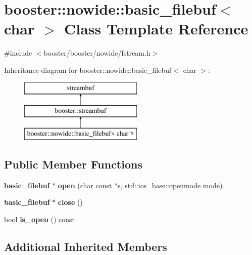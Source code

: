 \section{booster\-:\-:nowide\-:\-:basic\-\_\-filebuf$<$ char $>$ Class Template Reference}
\label{classbooster_1_1nowide_1_1basic__filebuf_3_01char_01_4}


{\ttfamily \#include $<$booster/booster/nowide/fstream.\-h$>$}

Inheritance diagram for booster\-:\-:nowide\-:\-:basic\-\_\-filebuf$<$ char $>$\-:\begin{figure}[H]
\begin{center}
\leavevmode
\includegraphics[height=3.000000cm]{classbooster_1_1nowide_1_1basic__filebuf_3_01char_01_4}
\end{center}
\end{figure}
\subsection*{Public Member Functions}
\begin{DoxyCompactItemize}
\item 
{\bf basic\-\_\-filebuf} $\ast$ {\bfseries open} (char const $\ast$s, std\-::ios\-\_\-base\-::openmode mode)\label{classbooster_1_1nowide_1_1basic__filebuf_3_01char_01_4_af53fd41ad94523460647b3a95411a548}

\item 
{\bf basic\-\_\-filebuf} $\ast$ {\bfseries close} ()\label{classbooster_1_1nowide_1_1basic__filebuf_3_01char_01_4_aae0ace743846530c663c267010470126}

\item 
bool {\bfseries is\-\_\-open} () const \label{classbooster_1_1nowide_1_1basic__filebuf_3_01char_01_4_a8c0ba603f3592a54d624e0d91bfab624}

\end{DoxyCompactItemize}
\subsection*{Additional Inherited Members}


